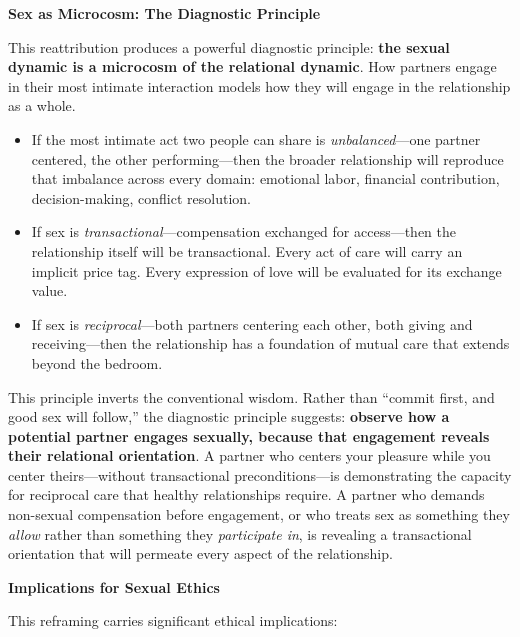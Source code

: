 \documentclass[12pt,openany]{book}
\numberwithin{equation}{chapter}
\begin{document}
\textbf{Sex as Microcosm: The Diagnostic Principle}

This reattribution produces a powerful diagnostic principle: \textbf{the sexual dynamic is a microcosm of the relational dynamic}. How partners engage in their most intimate interaction models how they will engage in the relationship as a whole.

\begin{itemize}
    \item If the most intimate act two people can share is \textit{unbalanced}---one partner centered, the other performing---then the broader relationship will reproduce that imbalance across every domain: emotional labor, financial contribution, decision-making, conflict resolution.
    
    \item If sex is \textit{transactional}---compensation exchanged for access---then the relationship itself will be transactional. Every act of care will carry an implicit price tag. Every expression of love will be evaluated for its exchange value.
    
    \item If sex is \textit{reciprocal}---both partners centering each other, both giving and receiving---then the relationship has a foundation of mutual care that extends beyond the bedroom.
\end{itemize}

This principle inverts the conventional wisdom. Rather than ``commit first, and good sex will follow,'' the diagnostic principle suggests: \textbf{observe how a potential partner engages sexually, because that engagement reveals their relational orientation}. A partner who centers your pleasure while you center theirs---without transactional preconditions---is demonstrating the capacity for reciprocal care that healthy relationships require. A partner who demands non-sexual compensation before engagement, or who treats sex as something they \textit{allow} rather than something they \textit{participate in}, is revealing a transactional orientation that will permeate every aspect of the relationship.

\textbf{Implications for Sexual Ethics}

This reframing carries significant ethical implications:
\end{document}
